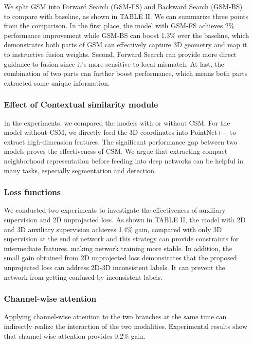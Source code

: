 \documentclass[letterpaper, 10 pt, conference]{ieeeconf}
\begin{document}
We split GSM into Forward Search (GSM-FS) and Backward Search (GSM-BS) to compare with baseline, as shown in TABLE II. We can summarize three points from the comparison. In the first place, the model with GSM-FS achieves 2\% performance improvement while GSM-BS can boost 1.3\% over the baseline, which demonstrates both parts of GSM can effectively capture 3D geometry and map it to instructive fusion weights. Second, Forward Search can provide more direct guidance to fusion since it's more sensitive to local mismatch. At last, the combination of two parts can further boost performance, which means both parts extracted some unique information.


\subsubsection{\textbf{Effect of Contextual similarity module}}

In the experiments, we compared the models with or without CSM. For the model without CSM, we directly feed the 3D coordinates into PointNet++ to extract high-dimension features. The significant performance gap between two models proves the effectiveness of CSM. We argue that extracting compact neighborhood representation before feeding into deep networks can be helpful in many tasks, especially segmentation and detection.


\subsubsection{\textbf{Loss functions}}


We conducted two experiments to investigate the effectiveness of auxiliary supervision and 2D unprojected loss. As shown in TABLE II, the model with 2D and 3D auxiliary supervision achieves 1.4\% gain, compared with only 3D supervision at the end of network and this strategy can provide constraints for intermediate features, making network training more stable. In addition, the small gain obtained from 2D unprojected loss demonstrates that the proposed unprojected loss can address 2D-3D inconsistent labels. It can prevent the network from getting confused by inconsistent labels.

\subsubsection{\textbf{Channel-wise attention}}

Applying channel-wise attention to the two branches at the same time can indirectly realize the interaction of the two modalities. Experimental results show that channel-wise attention provides 0.2\% gain.
\end{document}

